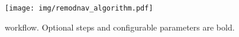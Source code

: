 %

\begin{figure}
  \texttt{[image: img/remodnav\_algorithm.pdf]}
  \caption{\remodnav workflow. Optional steps and configurable parameters are bold.}
  \label{fig:alg}
\end{figure}

